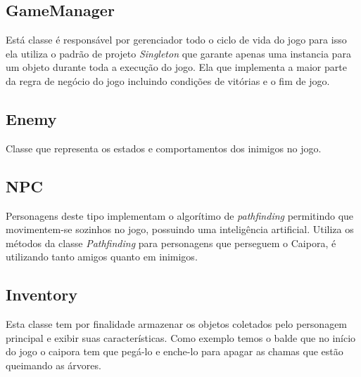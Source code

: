 \subsection{GameManager}
Está classe é responsável por gerenciador todo o ciclo de vida do jogo para isso ela  utiliza o padrão de projeto \textit{Singleton} que garante apenas uma instancia para um objeto durante toda a execução do jogo. Ela que implementa a maior parte da regra de negócio do jogo incluindo condições de vitórias e o fim de jogo.

\subsection{Enemy}
Classe que representa os estados e comportamentos dos inimigos no jogo.


\subsection{NPC}
Personagens deste tipo implementam o algorítimo de \textit{pathfinding}  permitindo que movimentem-se sozinhos no jogo, possuindo uma inteligência artificial. Utiliza os métodos da classe \textit{Pathfinding} para personagens que perseguem o Caipora, é utilizando tanto amigos quanto em inimigos.


	\begin{figure}[h!]
		\centering
	\end{figure}

\subsection{Inventory}
Esta classe tem por finalidade armazenar os objetos coletados pelo personagem principal e exibir suas características. Como exemplo temos o balde que no início do jogo o caipora tem que pegá-lo e enche-lo para apagar as chamas que estão queimando as árvores.


